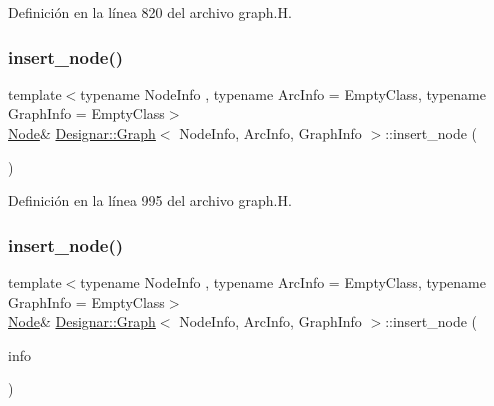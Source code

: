 Definición en la línea 820 del archivo graph.\+H.

\mbox{\label{class_designar_1_1_graph_a5da24cc7de9ae39b1df684cb75782fed}} 
\subsubsection{\texorpdfstring{insert\+\_\+node()}{insert\_node()}\hspace{0.1cm}{\footnotesize\ttfamily [2/4]}}
{\footnotesize\ttfamily template$<$typename Node\+Info , typename Arc\+Info  = Empty\+Class, typename Graph\+Info  = Empty\+Class$>$ \\
\hyperlink{class_designar_1_1_graph_a5dfc7dba9d092ac489c72e40390c37d0}{Node}\& \hyperlink{class_designar_1_1_graph}{Designar\+::\+Graph}$<$ Node\+Info, Arc\+Info, Graph\+Info $>$\+::insert\+\_\+node (\begin{DoxyParamCaption}{ }\end{DoxyParamCaption})\hspace{0.3cm}{\ttfamily [inline]}}



Definición en la línea 995 del archivo graph.\+H.

\mbox{\label{class_designar_1_1_graph_a573d7ab63075e30bc8c5aaa2a80548ec}} 
\subsubsection{\texorpdfstring{insert\+\_\+node()}{insert\_node()}\hspace{0.1cm}{\footnotesize\ttfamily [3/4]}}
{\footnotesize\ttfamily template$<$typename Node\+Info , typename Arc\+Info  = Empty\+Class, typename Graph\+Info  = Empty\+Class$>$ \\
\hyperlink{class_designar_1_1_graph_a5dfc7dba9d092ac489c72e40390c37d0}{Node}\& \hyperlink{class_designar_1_1_graph}{Designar\+::\+Graph}$<$ Node\+Info, Arc\+Info, Graph\+Info $>$\+::insert\+\_\+node (\begin{DoxyParamCaption}\item[{const Node\+Info \&}]{info }\end{DoxyParamCaption})\hspace{0.3cm}{\ttfamily [inline]}}



